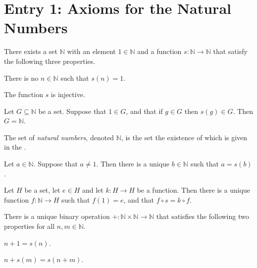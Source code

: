 \section{Entry 1: Axioms for the Natural Numbers}
\label{nat}

\begin{axiom} %
	\label{nat:a:peano}
	There exists a set $\mathbb{N}$ with an element $1 \in \mathbb{N}$ and a function $s : \mathbb{N} \to \mathbb{N}$ that satisfy the following three properties.
	\begin{lenumerate}
		\item \label{nat:a:peano:1}
		      There is no $n \in \mathbb{N}$ such that $s(n) = 1$.
		\item \label{nat:a:peano:injective}
		      The function $s$ is injective.
		\item \label{nat:a:peano:induction}
		      Let $G \subseteq \mathbb{N}$ be a set. Suppose that $1 \in G$, and that if $g \in G$ then $s(g) \in G$. Then
		      $G = \mathbb{N}$.
	\end{lenumerate}
\end{axiom}

\begin{definition} %
	\label{nat:d:natural}
	The set of \emph{natural numbers}, denoted $\mathbb{N}$, is the set the existence of which is given in the .
\end{definition}

\begin{lemma} %
	\label{nat:l:exists_prev}
	Let $a \in \mathbb{N}$. Suppose that $a \not= 1$. Then there is a unique $b \in \mathbb{N}$ such that $a = s(b)$.
\end{lemma}

\begin{theorem} %
	\label{nat:t:recusion}
	Let $H$ be a set, let $e \in H$ and let $k : H \to H$ be a function. Then there is a unique function $f : \mathbb{N} \to H$ such that $f(1) = e$, and that $f \circ s = k \circ f$.
\end{theorem}

\begin{theorem} %
	\label{nat:t:add}
	There is a unique binary operation $+ : \mathbb{N} \times \mathbb{N} \to \mathbb{N}$ that satisfies the following two properties for all $n, m \in \mathbb{N}$.
	\begin{lenumerate}
		\item \label{nat:t:add:1}
		      $n + 1 = s(n)$.
		\item \label{nat:t:add:n}
		      $n + s(m) = s(n + m)$.
	\end{lenumerate}
\end{theorem}


